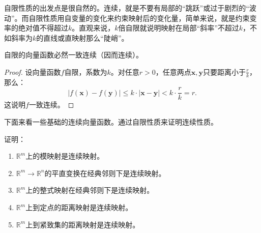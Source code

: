 \documentclass[12pt,UTF8,fontset=none]{ctexbook}
\begin{document}
自限性质的出发点是很自然的。连续，就是不要有局部的“跳跃”或过于剧烈的“波动”。而自限性质用自变量的变化来约束映射后的变化量，简单来说，就是约束变率的绝对值不得超过$k$。直观来说，$k$倍自限就说明映射在局部“斜率”不超过$k$，不如斜率为$k$的直线或直映射那么“陡峭”。

\begin{tm}
    自限的向量函数必然一致连续（因而连续）。
\end{tm}

\begin{proof}
    设向量函数$f$自限，系数为$k$。对任意$r>0$，任意两点$\mathbf{x},\mathbf{y}$只要距离小于$\displaystyle\frac{r}{k}$，那么：
    $$ |f(\mathbf{x}) - f(\mathbf{y})| \leqslant k\cdot |\mathbf{x} - \mathbf{y}| < k \cdot \frac{r}{k} = r. $$
    这说明$f$一致连续。
\end{proof}

下面来看一些基础的连续向量函数。通过自限性质来证明连续性质。

\begin{et}
    证明：
    \begin{enumerate}[label=\arabic*.]
        \item $\mathbb{R}^m$上的模映射是连续映射。
        \item $\mathbb{R}^m \rightarrow \mathbb{R}^n$的平直变换在经典邻则下是连续映射。
        \item $\mathbb{R}^m$上的整式映射在经典邻则下是连续映射。
        \item $\mathbb{R}^m$上到定点的距离映射是连续映射。
        \item $\mathbb{R}^m$上到紧致集的距离映射是连续映射。
    \end{enumerate}
\end{et}
\end{document}
